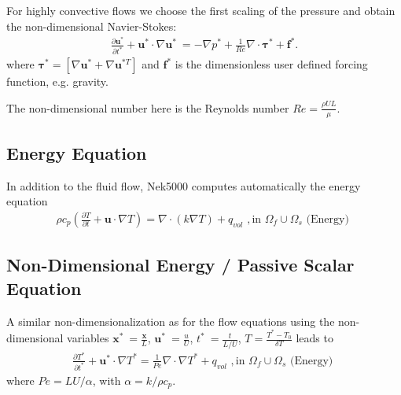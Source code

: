 \documentclass[letterpaper,10pt,english]{sphinxmanual}
\begin{document}
For highly convective flows we choose the first scaling of the pressure and obtain the
non-dimensional Navier-Stokes:
\begin{equation}\label{equation:theory:NS_nondim}
\begin{split}\frac{\partial \mathbf{u^*}}{\partial t^*} + \mathbf{u^*} \cdot \nabla \mathbf{u^*}\ = -\nabla p^* + \frac{1}{Re} \nabla\cdot \boldsymbol\tau^* + \mathbf f^*.\end{split}
\end{equation}
where \(\boldsymbol\tau^*=[\nabla \mathbf u^*+\nabla \mathbf u^{*T}]\) and \(\mathbf f^*\) is the dimensionless user defined forcing function, e.g. gravity.

The non-dimensional number here is the Reynolds number \(Re=\frac{\rho U L}{\mu}\).


\subsection{Energy Equation}
\label{\detokenize{theory:energy-equation}}\label{\detokenize{theory:intro-energy}}
In addition to the fluid flow, Nek5000 computes automatically the energy equation
\begin{equation}\label{equation:theory:energy}
\begin{split}\rho c_{p} \left( \frac{\partial T}{\partial t} + \mathbf u \cdot \nabla T \right) =
   \nabla \cdot (k \nabla T) + q_{vol}\,\, ,\text{in } \Omega_f\cup \Omega_s  \text{  (Energy)  }\end{split}
\end{equation}

\subsection{Non-Dimensional Energy / Passive Scalar Equation}
\label{\detokenize{theory:intro-energy-nondim}}\label{\detokenize{theory:non-dimensional-energy-passive-scalar-equation}}
A similar non-dimensionalization as for the flow equations using the non-dimensional variables
\(\mathbf x^*\ = \frac{\mathbf x}{L}\),  \(\mathbf u^*\ = \frac{u}{U}\), \(t^*\ =
\frac{t}{L/U}\), \(T=\frac{T^*-T_0}{\delta T}\) leads to
\begin{equation}\label{equation:theory:energy_nondim}
\begin{split}\frac{\partial T^*}{\partial t^*} + \mathbf u^* \cdot \nabla T^* =
  \frac{1}{Pe} \nabla \cdot \nabla T^* + q_{vol}\,\, ,\text{in } \Omega_f\cup \Omega_s  \text{  (Energy)  }\end{split}
\end{equation}
where \(Pe=LU/\alpha\), with \(\alpha=k/\rho c_p\).
\end{document}

